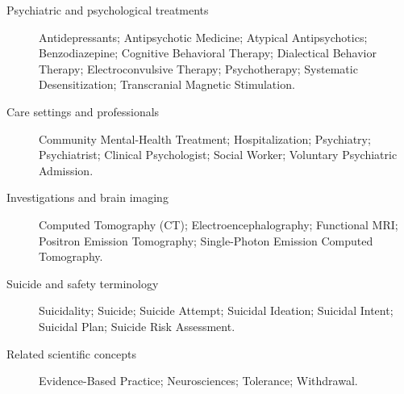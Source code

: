 \begin{description}
\item[Psychiatric and psychological treatments] Antidepressants; Antipsychotic Medicine; Atypical Antipsychotics; Benzodiazepine; Cognitive Behavioral Therapy; Dialectical Behavior Therapy; Electroconvulsive Therapy; Psychotherapy; Systematic Desensitization; Transcranial Magnetic Stimulation.

\item[Care settings and professionals] Community Mental-Health Treatment; Hospitalization; Psychiatry; Psychiatrist; Clinical Psychologist; Social Worker; Voluntary Psychiatric Admission.

\item[Investigations and brain imaging] Computed Tomography (CT); Electroencephalography; Functional MRI; Positron Emission Tomography; Single-Photon Emission Computed Tomography.

\item[Suicide and safety terminology] Suicidality; Suicide; Suicide Attempt; Suicidal Ideation; Suicidal Intent; Suicidal Plan; Suicide Risk Assessment.

\item[Related scientific concepts] Evidence-Based Practice; Neurosciences; Tolerance; Withdrawal.
\end{description}
